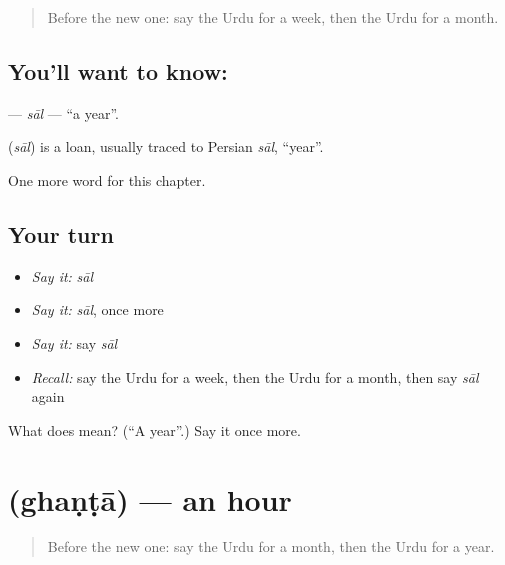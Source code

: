 \label{lesson:UR-C75-sal}



\begin{quote}
Before the new one: say the Urdu for a week, then the Urdu for a month.
\end{quote}

\subsection*{You'll want to know: }
\textbf{} — \emph{sāl} — \textquotedblleft{}a year\textquotedblright{}.

\begin{cousinweb}
\textbf{} (\emph{sāl}) is a loan, usually traced to Persian \emph{sāl}, \textquotedblleft{}year\textquotedblright{}.
\end{cousinweb}

\begin{grammarlens}[title={What you've built}]
One more word for this chapter.
\end{grammarlens}

\subsection*{Your turn}
\begin{itemize}
\raggedright
  \item \emph{Say it:} \emph{sāl}
  \item \emph{Say it:} \emph{sāl}, once more
  \item \emph{Say it:} say \emph{sāl}
  \item \emph{Recall:} say the Urdu for a week, then the Urdu for a month, then say \emph{sāl} again
\end{itemize}

\begin{tcolorbox}[breakable,colback=teal!4,colframe=teal!35!black,title={Before you move on}]
What does  mean? (\textquotedblleft{}A year\textquotedblright{}.) Say it once more.
\end{tcolorbox}
\section[\texorpdfstring{\ur{گھنٹہ} (ghaṇṭā)}{گھنٹہ (ghaṇṭā)}]{ (ghaṇṭā) — an hour}

\label{lesson:UR-C75-ghanta}



\begin{quote}
Before the new one: say the Urdu for a month, then the Urdu for a year.
\end{quote}

